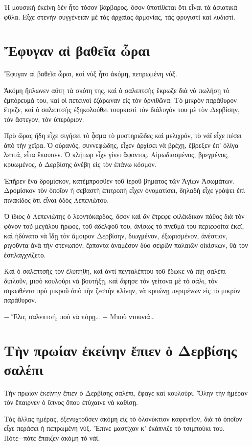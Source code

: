 \documentclass[11pt]{article}
\begin{document}
Ἡ μουσικὴ ἐκείνη δὲν ἦτο τόσον βάρβαρος, ὅσον ὑποτίθεται ὅτι εἶναι τὰ ἀσιατικὰ φῦλα. Εἶχε στενὴν συγγένειαν μὲ τὰς ἀρχαίας ἁρμονίας, τὰς φρυγιστὶ καὶ λυδιστί.

\section{Ἔφυγαν αἱ βαθεῖα ὧραι}
\label{sec:org34d1a46}
Ἔφυγαν αἱ βαθεῖα ὧραι, καὶ νὺξ ἦτο ἀκόμη, πεπρωμένη νύξ.

Ἀκόμη ἥπλωνεν αὕτη τὰ σκότη της, καὶ ὁ σαλεπτσὴς ἔκρωζε διὰ νὰ πωλήσῃ τὸ ἐμπόρευμά του, καὶ οἱ πετεινοὶ ἐζάρωναν εἰς τὸν ὀρνιθῶνα. Τὸ μικρὸν παράθυρον ἔτριζε, καὶ ὁ σαλεπτσὴς ἐξηκολούθει τουρκιστὶ τὸν διάλογόν του μὲ τὸν Δερβίσην, τὸν ἄστεγον, τὸν ὑπερόριον.

Πρὸ ὥρας ἤδη εἶχε σιγήσει τὸ ᾆσμα τὸ μυστηριῶδες καὶ μελιχρόν, τὸ νάϊ εἶχε πέσει ἀπὸ τὴν χεῖρα. Ὁ οὐρανός, συννεφώδης, εἶχεν ἀρχίσει νὰ βρέχῃ, ἔβρεξεν ἐπ' ὀλίγα λεπτά, εἶτα ἔπαυσεν. Ὁ κλήτωρ εἶχε γίνει ἄφαντος. Αἱμωδιασμένος, βρεγμένος, κρυωμένος, ὁ Δερβίσης ἀνέβη εἰς τὸν ἐπάνω κόσμον.

Ἐπῆρεν ἕνα δρομίσκον, κατέμπροσθεν τοῦ ἱεροῦ βήματος τῶν Ἁγίων Ἀσωμάτων. Δρομίσκον τὸν ὁποῖον ἡ σεβαστὴ ἐπιτροπὴ εἶχεν ὀνοματίσει, δηλαδὴ εἶχε γράψει ἐπὶ πινακίδος ὅτι εἶναι ὁδὸς Λεπενιώτου.

Ὁ ἴδιος ὁ Λεπενιώτης ὁ λεοντόκαρδος, ὅσον καὶ ἂν ἔτρεφε φιλέκδικον πάθος διὰ τὸν φόνον τοῦ μεγάλου ἥρωος, τοῦ ἀδελφοῦ του, ἀνίσως τὸ πνεῦμά του περιεφοίτα ἐκεῖ, καὶ ἠδύνατο νὰ ἴδῃ τὸν ἄμοιρον Δερβίσην, διωγμένον, ἐξωρισμένον, ἀνέστιον, ριγοῦντα ἀνὰ τὴν στενωπόν, ἕρποντα ἀναμέσον δύο σειρῶν παλαιῶν οἰκίσκων, θὰ τὸν ἐσπλαγχνίζετο.

Καὶ ὁ σαλεπτσὴς τὸν ἐλυπήθη, καὶ ἀντὶ πενταλέπτου τοῦ ἔδωκε νὰ πίῃ σαλέπι διπλοῦν, μισὸ κουλούρι νὰ βουτήξῃ, καὶ ἄφησε τὸν γείτονα μὲ τὸ σάλι, τὸν σηκωθέντα πρὸ μικροῦ ἀπὸ τὴν ζεστὴν κλίνην, νὰ κρυώνῃ περιμένων εἰς τὸ μικρὸν παράθυρον.

− Ἔλα, σαλεπτσή, ποὺ νὰ πάρῃ…
− Μποὺ ντουνιά…

\section{Τὴν πρωίαν ἐκείνην ἔπιεν ὁ Δερβίσης σαλέπι}
\label{sec:org3a6853e}
Τὴν πρωίαν ἐκείνην ἔπιεν ὁ Δερβίσης σαλέπι, ἔφαγε καὶ κουλούρι. Ὅλην τὴν ἡμέραν τὸν ἔπαιρνεν ὁ ὕπνος ὅπου ἐτύχαινε νὰ καθίσῃ.

Τὰς ἄλλας ἡμέρας, ἐξενυχτοῦσεν ἀκόμη εἰς τὸ ὁλονύκτιον καφενεῖον, διὰ τὸ ὁποῖον εἶχε περάσει ἡ πεπρωμένη νύξ. Ἔπινε μαστίχαν κ' ἐκάπνιζε τὸ τσιμπούκι του. Πότε−πότε ἔπαιζεν ἀκόμη τὸ νάϊ.
\end{document}
